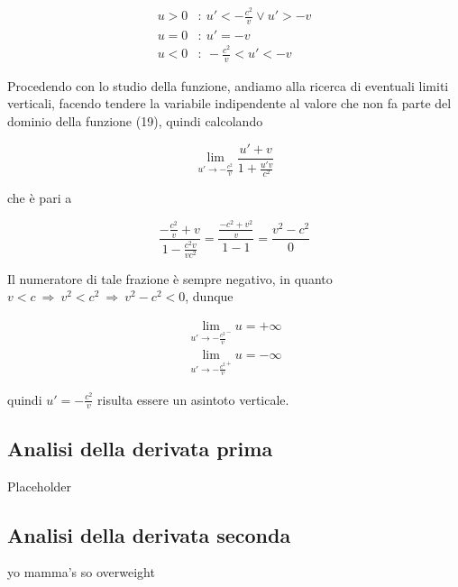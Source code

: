 \documentclass{article}
\begin{document}
\begin{align*}
    u > 0 &:\ u' < - \frac{c^2}{v} \vee u' > -v  \\
    u = 0 &:\ u' = -v \\
    u < 0 &:\ - \frac{c^2}{v} < u' < -v
\end{align*}

Procedendo con lo studio della funzione, andiamo alla ricerca
di eventuali limiti verticali, facendo tendere la variabile
indipendente al valore che non fa parte del dominio della
funzione (19), quindi calcolando

\begin{equation}
    \lim_{u' \rightarrow - \frac{c^2}{v}}{\frac{u' + v}{1 + \frac{u'v}{c^2}}}
\end{equation}

che è pari a

\begin{equation}
    \frac{- \frac{c^2}{v} + v}{1 - \frac{c^2v}{vc^2}} = \frac{\frac{-c^2 + v^2}{v}}{1 - 1} = \frac{v^2 - c^2}{0}
\end{equation}

Il numeratore di tale frazione è sempre negativo,
in quanto \(v < c\ \Rightarrow\ v^2 < c^2\ \Rightarrow\ v^2 - c^2 < 0\),
dunque

\begin{align*}
    \lim_{u' \rightarrow - \frac{c^2}{v}^-}{u} = + \infty \\
    \lim_{u' \rightarrow - \frac{c^2}{v}^+}{u} = - \infty
\end{align*}

quindi \(u' = - \frac{c^2}{v}\) risulta essere un asintoto verticale.


\subsection{Analisi della derivata prima}
Placeholder

\subsection{Analisi della derivata seconda}
yo mamma's so overweight
\end{document}
